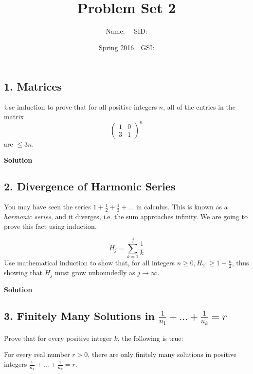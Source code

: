 \documentclass{article}
\title{Problem Set 2}
\author{Name: $\quad$SID: }
\date{Spring 2016$\quad$GSI: }
\begin{document}
\maketitle

\subsection*{1. Matrices}
Use induction to prove that for all positive integers $n$, all of the entries in the matrix
$$\left(\begin{array}{cc}1 & 0 \\3 & 1\end{array}\right)^n$$
are $\leqslant 3n$.
\begin{mdframed}
\textbf{Solution}

\end{mdframed}

\clearpage

\subsection*{2. Divergence of Harmonic Series}
You may have seen the series $1+\frac{1}{2}+\frac{1}{3}+\ldots$ in calculus. This is known as a \textit{harmonic series}, and it diverges, i.e. the sum approaches infinity. We are going to prove this fact using induction.

 $$H_j=\sum_{k=1}^{j}\frac{1}{k}$$ Use mathematical induction to show that, for all integers $n\geqslant 0, H_{2^n}\geqslant 1+\frac{n}{2}$, thus showing that $H_j$ must grow unboundedly as $j\to\infty$.
\begin{mdframed}
\textbf{Solution}

\end{mdframed}

\clearpage

\subsection*{3. Finitely Many Solutions in $\frac{1}{n_1}+\ldots+\frac{1}{n_k}=r$}
Prove that for every positive integer $k$, the following is true:

\vspace{2mm}
For every real number $r>0$, there are only finitely many solutions in positive integers $\frac{1}{n_1}+\ldots+\frac{1}{n_k}=r$.
\vspace{2mm}

\end{document}
